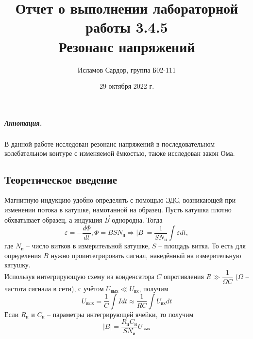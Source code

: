 \documentclass[12pt,a4paper]{article}
\title{Отчет о выполнении лабораторной работы 3.4.5\\
Резонанс напряжений}
\author{Исламов Сардор, группа Б02-111}
\date{29 октября 2022 г.}
\begin{document}
\maketitle
\subparagraph*{Аннотация.} 
В данной работе исследован резонанс напряжений в последовательном колебательном контуре с изменяемой ёмкостью, также исследован закон Ома.

\subsection*{Теоретическое введение}
Магнитную индукцию удобно определять с помощью ЭДС, возникающей при изменении потока в катушке, намотанной на образец. 
Пусть катушка плотно обхватывает образец, а индукция $\vec{B}$ однородна. 
Тогда
\[
\varepsilon = -\dfrac{d\Phi}{dt}, \Phi = BSN_\text{и} \Rightarrow |B|=\dfrac{1}{SN_\text{и}}\int \varepsilon dt,
\]
где $N_\text{и}$ -- число витков в измерительной катушке, $S$ -- площадь витка. 
То есть для определения $B$ нужно проинтегрировать сигнал, наведённый на измерительную катушку.\\
Используя интегрирующую схему из конденсатора $C$ опротивления $R \gg \dfrac{1}{\Omega C}$ ($\Omega$ -- частота сигнала в сети), с учётом $U_{\text{вых}} \ll U_{\text{вх}}$, получим
\[
U_{\text{вых}}=\dfrac{1}{C}\int Idt \approx \dfrac{1}{RC}\int U_{\text{вх}}dt
\]
Если $R_{\text{и}}$ и $C_{\text{и}}$ -- параметры интегрирующей ячейки, то получим
\begin{equation}
    |B| = \dfrac{R_{\text{и}}C_{\text{и}}}{SN_\text{и}}U_{\text{вых}} 
\end{equation}
\end{document}
